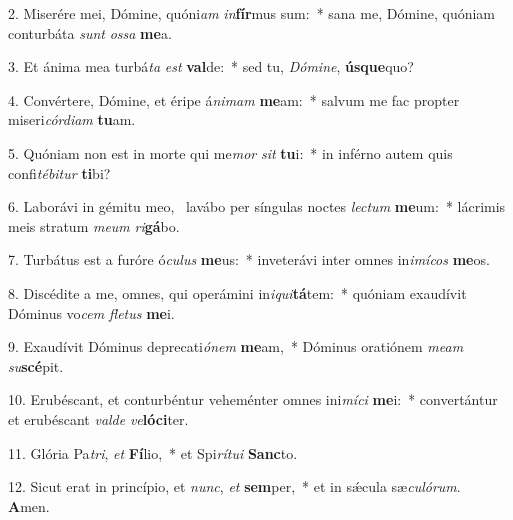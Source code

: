 2. Miserére mei, Dómine, quóni\textit{am} \textit{in}\textbf{fír}mus sum:~*  sana me, Dómine, quóniam conturbáta \textit{sunt} \textit{os}\textit{sa} \textbf{me}a.\

3. Et ánima mea turbá\textit{ta} \textit{est} \textbf{val}de:~*  sed tu, \textit{Dó}\textit{mi}\textit{ne}, \textbf{ús}\textbf{que}quo?\

4. Convértere, Dómine, et éripe á\textit{ni}\textit{mam} \textbf{me}am:~*  salvum me fac propter miseri\textit{cór}\textit{di}\textit{am} \textbf{tu}am.\

5. Quóniam non est in morte qui me\textit{mor} \textit{sit} \textbf{tu}i:~*  in inférno autem quis confi\textit{té}\textit{bi}\textit{tur} \textbf{ti}bi?\

6. Laborávi in gémitu meo, \dag\  lavábo per síngulas noctes \textit{lec}\textit{tum} \textbf{me}um:~*  lácrimis meis stratum \textit{me}\textit{um} \textit{ri}\textbf{gá}bo.\

7. Turbátus est a furóre ó\textit{cu}\textit{lus} \textbf{me}us:~*  inveterávi inter omnes in\textit{i}\textit{mí}\textit{cos} \textbf{me}os.\

8. Discédite a me, omnes, qui operámini in\textit{i}\textit{qui}\textbf{tá}tem:~*  quóniam exaudívit Dóminus vo\textit{cem} \textit{fle}\textit{tus} \textbf{me}i.\

9. Exaudívit Dóminus deprecati\textit{ó}\textit{nem} \textbf{me}am,~*  Dóminus oratiónem \textit{me}\textit{am} \textit{su}\textbf{scé}pit.\

10. Erubéscant, et conturbéntur veheménter omnes ini\textit{mí}\textit{ci} \textbf{me}i:~*  convertántur et erubéscant \textit{val}\textit{de} \textit{ve}\textbf{ló}\textbf{ci}ter.\

11. Glória Pa\textit{tri}, \textit{et} \textbf{Fí}lio,~*  et Spi\textit{rí}\textit{tu}\textit{i} \textbf{Sanc}to.\

12. Sicut erat in princípio, et \textit{nunc}, \textit{et} \textbf{sem}per,~*  et in sǽcula sæ\textit{cu}\textit{ló}\textit{rum}. \textbf{A}men.\

